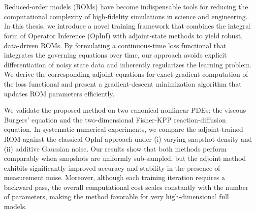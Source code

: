 
\chapter*{\abstractname}


Reduced-order models (ROMs) have become indispensable tools for reducing the computational complexity of high-fidelity simulations in science and engineering.  In this thesis, we introduce a novel training framework that combines the integral form of Operator Inference (OpInf) with adjoint-state methods to yield robust, data-driven ROMs. By formulating a continuous-time loss functional that integrates the governing equations over time, our approach avoids explicit differentiation of noisy state data and inherently regularizes the learning problem. We derive the corresponding adjoint equations for exact gradient computation of the loss functional and present a gradient-descent minimization algorithm that updates ROM parameters efficiently.

We validate the proposed method on two canonical nonlinear PDEs: the viscous Burgers’ equation and the two-dimensional Fisher-KPP reaction-diffusion equation. In systematic numerical experiments, we compare the adjoint-trained ROM against the classical OpInf approach under (i) varying snapshot density and (ii) additive Gaussian noise. Our results show that both methods perform comparably when snapshots are uniformly sub-sampled, but the adjoint method exhibits significantly improved accuracy and stability in the presence of measurement noise.  Moreover, although each training iteration requires a backward pass, the overall computational cost scales constantly with the number of parameters, making the method favorable for very high-dimensional full models.



  




